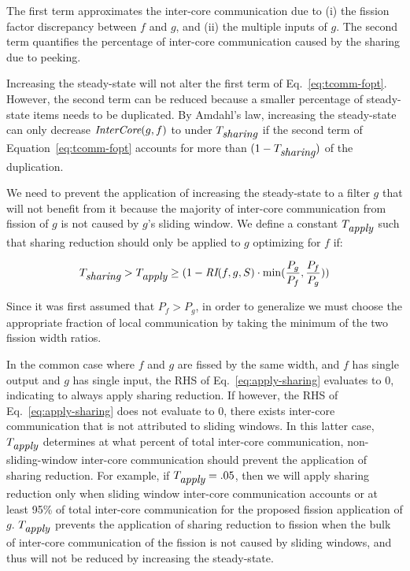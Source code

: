 \noindent The first term approximates the inter-core communication due
to (i) the fission factor discrepancy between $f$ and $g$, and (ii) the
multiple inputs of $g$.  The second term quantifies the percentage of
inter-core communication caused by the sharing due to peeking.

Increasing the steady-state will not alter the first term of
Eq.~\ref{eq:tcomm-fopt}.  However, the second term can be reduced
because a smaller percentage of steady-state items needs to be
duplicated.  By Amdahl's law, increasing the steady-state can only
decrease $\mbox{\it InterCore}(g, f)$ to under $T_{\mbox{\it sharing}}$ if the
second term of Equation~\ref{eq:tcomm-fopt} accounts for more than
$(1-T_{\mbox{\it sharing}} )$ of the duplication.  

We need to prevent the application of increasing the steady-state to a
filter $g$ that will not benefit from it because the majority of
inter-core communication from fission of $g$ is not caused by $g$'s
sliding window.  We define a constant $T_{\mbox{\it apply}}$ such that
sharing reduction should only be applied to $g$ optimizing for $f$ if:

\begin{equation}
\label{eq:apply-sharing}
T_{\mt{sharing}}  >  T_{\mt{apply}} \ge (1 -\mt{RI}(f,g, S) \cdot
\min(\frac{P_g}{P_f}, \frac{P_f}{P_g}))
\end{equation}


\noindent Since it was first assumed that $P_f > P_g$, in order to
generalize we must choose the appropriate fraction of local
communication by taking the minimum of the two fission width ratios.

In the common case where $f$ and $g$ are fissed by the same width, and
$f$ has single output and $g$ has single input, the RHS of
Eq.~\ref{eq:apply-sharing} evaluates to 0, indicating to always apply
sharing reduction.  If however, the RHS of Eq.~\ref{eq:apply-sharing}
does not evaluate to 0, there exists inter-core communication that is
not attributed to sliding windows.  In this latter case,
$T_{\mbox{\it apply}}$ determines at what percent of total inter-core
communication, non-sliding-window inter-core communication should
prevent the application of sharing reduction.  For example, if
$T_{\mbox{\it apply}} = .05$, then we will apply sharing reduction only when
sliding window inter-core communication accounts or at least 95\% of
total inter-core communication for the proposed fission application of
$g$. $T_{\mbox{\it apply}}$ prevents the application of sharing reduction to
fission when the bulk of inter-core communication of the fission is
not caused by sliding windows, and thus will not be reduced by
increasing the steady-state.

